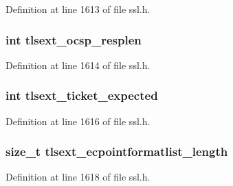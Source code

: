 Definition at line 1613 of file ssl.\+h.

\subsubsection[{\texorpdfstring{tlsext\+\_\+ocsp\+\_\+resplen}{tlsext_ocsp_resplen}}]{\setlength{\rightskip}{0pt plus 5cm}int tlsext\+\_\+ocsp\+\_\+resplen}\hypertarget{structssl__st_a468160b672652db37243c0c954d9cfba}{}\label{structssl__st_a468160b672652db37243c0c954d9cfba}


Definition at line 1614 of file ssl.\+h.

\subsubsection[{\texorpdfstring{tlsext\+\_\+ticket\+\_\+expected}{tlsext_ticket_expected}}]{\setlength{\rightskip}{0pt plus 5cm}int tlsext\+\_\+ticket\+\_\+expected}\hypertarget{structssl__st_ade29ff7dfa991a7a99efa0964a1115cb}{}\label{structssl__st_ade29ff7dfa991a7a99efa0964a1115cb}


Definition at line 1616 of file ssl.\+h.

\subsubsection[{\texorpdfstring{tlsext\+\_\+ecpointformatlist\+\_\+length}{tlsext_ecpointformatlist_length}}]{\setlength{\rightskip}{0pt plus 5cm}size\+\_\+t tlsext\+\_\+ecpointformatlist\+\_\+length}\hypertarget{structssl__st_ae7ba2dfb840d8ff09aea0b9d2ce00a9f}{}\label{structssl__st_ae7ba2dfb840d8ff09aea0b9d2ce00a9f}


Definition at line 1618 of file ssl.\+h.

